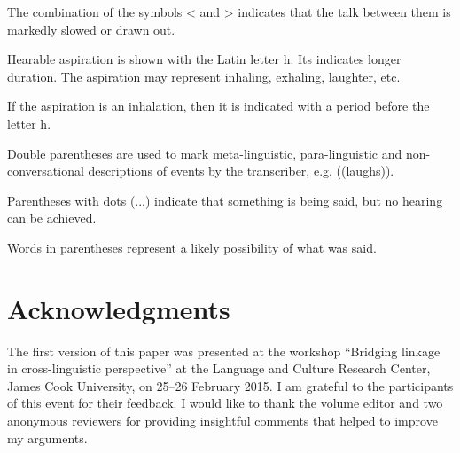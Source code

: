 \documentclass[output=paper]{LSP/langsci}
\begin{document}
\begin{description}
\item The combination of the symbols < and > indicates that the talk between them is markedly slowed or drawn out. 
\item Hearable aspiration is shown with the Latin letter h. Its  indicates longer duration. The aspiration may represent inhaling, exhaling, laughter, etc. 
\item If the aspiration is an inhalation, then it is indicated with a period before the letter h. 
\item Double parentheses are used to mark meta-linguistic, para-linguistic and non-conversational descriptions of events by the transcriber, e.g. ((laughs)).
\item  Parentheses with dots (...) indicate that something is being said, but no hearing can be achieved. 
\item Words in parentheses represent a likely possibility of what was said. 
\end{description}



\section*{ Acknowledgments}
The first version of this paper was presented at the workshop ``Bridging linkage in cross-linguistic perspective'' at the Language and Culture Research Center, James Cook University, on 25--26 February 2015. I am grateful to the participants of this event for their feedback. I would like to thank the volume editor and two anonymous reviewers for providing insightful comments that helped to improve my arguments. 

\sloppy

\printbibliography[heading=subbibliography,notkeyword=this] 
\end{document}
